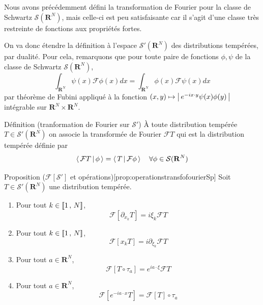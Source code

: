         Nous avons précédemment défini la transformation de Fourier pour la classe de Schwartz $\mathcal{S}(\mathbf{R}^N)$, mais celle-ci est peu satisfaisante car il s’agit d’une classe très restreinte de fonctions aux propriétés fortes. 

        On va donc étendre la définition à l’espace $\mathcal{S}'(\mathbf{R}^N)$ des distributions tempérées, par dualité. Pour cela, remarquons que pour toute paire de fonctions $\phi, \psi$ de la classe de Schwartz $\mathcal{S}(\mathbf{R}^N)$, 
        \[ \int_{\mathbf{R}^N} \psi(x) \mathcal{F}\phi(x) dx = \int_{\mathbf{R}^N} \phi(x) \mathcal{F}\psi(x) dx \]   
        par théorème de Fubini appliqué à la fonction $(x,y) \mapsto \left\lvert \, e^{- i x \cdot y} \psi(x) \phi(y) \, \right\rvert$ intégrable sur $\mathbf{R}^N \times \mathbf{R}^N$.

        \begin{omed}{Définition (tranformation de Fourier sur $\mathcal{S'}$)}
            À toute distribution tempérée $T \in \mathcal{S}'(\mathbf{R}^N)$ on associe la transformée de Fourier $\mathcal{F}T$ qui est la distribution tempérée définie par 
            \[ \left< \, \mathcal{F}T \, \middle| \, \phi \, \right> = \left< \, T \, \middle| \, \mathcal{F}\phi \, \right> \quad \forall \phi \in \mathcal{S}(\mathbf{R}^N) \]  
        \end{omed}

        \begin{omed}{Proposition ($\mathcal{F}[\mathcal{S}']$ et opérations)}[prop:operationstransfofourierSp]
            Soit $T \in \mathcal{S}'(\mathbf{R}^N)$ une distribution tempérée. 
            \begin{enumerate}[label=($p_{\arabic*}$)]
                \item Pour tout $k \in \left[\!\left[ 1 \, , \, N \right]\!\right]$, 
                \[ \mathcal{F}[\partial_{x_k} T] = i \xi_k \mathcal{F}T \]   
                \item Pour tout $k \in \left[\!\left[ 1 \, , \, N \right]\!\right]$, 
                \[ \mathcal{F}[{x_k} T] = i \partial_{\xi_k} \mathcal{F}T \]
                \item Pour tout $a \in \mathbf{R}^N$, 
                \[ \mathcal{F}[T \circ \tau_a] = e^{i a \cdot \xi} \mathcal{F}T \]   
                \item Pour tout $a \in \mathbf{R}^N$, 
                \[ \mathcal{F}[e^{-i a \cdot x}T] = \mathcal{F}[T] \circ \tau_a \] 
            \end{enumerate} 
        \end{omed}

